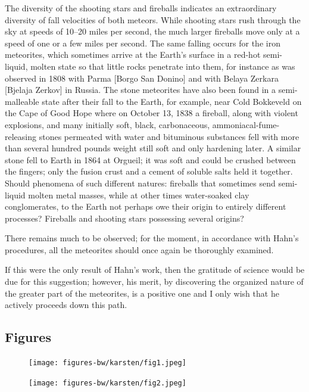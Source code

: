 \documentclass[a4paper, 12pt, oneside]{article}
\begin{document}
The diversity of the shooting stars and fireballs indicates an extraordinary diversity of fall velocities of both meteors. While shooting stars rush through the sky at speeds of 10--20 miles per second, the much larger fireballs move only at a speed of one or a few miles per second. The same falling occurs for the iron meteorites, which sometimes arrive at the Earth's surface in a red-hot semi-liquid, molten state so that little rocks penetrate into them, for instance as was observed in 1808 with Parma [Borgo San Donino] and with Belaya Zerkara [Bjelaja Zerkov] in Russia. The stone meteorites have also been found in a semi-malleable state after their fall to the Earth, for example, near Cold Bokkeveld on the Cape of Good Hope where on October 13, 1838 a fireball, along with violent explosions, and many initially soft, black, carbonaceous, ammoniacal-fume-releasing stones permeated with water and bituminous substances fell with more than several hundred pounds weight still soft and only hardening later. A similar stone fell to Earth in 1864 at Orgueil; it was soft and could be crushed between the fingers; only the fusion crust and a cement of soluble salts held it together. Should phenomena of such different natures: fireballs that sometimes send semi-liquid molten metal masses, while at other times water-soaked clay conglomerates, to the Earth not perhaps owe their origin to entirely different processes? Fireballs and shooting stars possessing several origins?

There remains much to be observed; for the moment, in accordance with Hahn's procedures, all the meteorites should once again be thoroughly examined.

If this were the only result of Hahn's work, then the gratitude of science would be due for this suggestion; however, his merit, by discovering the organized nature of the greater part of the meteorites, is a positive one and I only wish that he actively proceeds down this path.
\clearpage
\pagestyle{fancy}
\fancyhf{}
\cfoot{\thepage}
\subsection{Figures}
\begin{figure}[H]
\texttt{[image: figures-bw/karsten/fig1.jpeg]}
\centering
\end{figure}
\clearpage
{}
\begin{figure}[t]
\centering
\texttt{[image: figures-bw/karsten/fig2.jpeg]}
\end{figure}
\clearpage
\pagestyle{plain}
\end{document}
